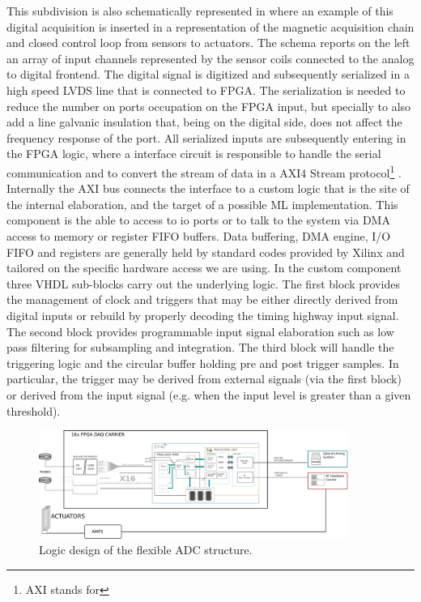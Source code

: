 This subdivision is also schematically represented in \Figure{\ref{fig:daq}} where an example of this digital acquisition is inserted in a representation of the magnetic acquisition chain and closed control loop from sensors to actuators. 
The schema reports on the left an array of input channels represented by the sensor coils connected to the analog to digital frontend. The digital signal is digitized and subsequently serialized in a high speed \ac{LVDS} line that is connected to FPGA. The serialization is needed to reduce the number on ports occupation on the FPGA input, but specially to also add a line galvanic insulation that, being on the digital side, does not affect the frequency response of the port.
All serialized inputs are subsequently entering in the FPGA logic, where a interface circuit is responsible to handle the serial communication and to convert the stream of data in a AXI4 Stream protocol\footnote{AXI stands for } \cite{AXI4}. Internally the AXI bus connects the interface to a custom logic that is the site of the internal elaboration, and the target of a possible ML implementation. This component is the able to access to io ports or to talk to the system via \ac{DMA} access to memory or register FIFO buffers.
%
Data buffering, DMA engine, I/O FIFO and registers are generally held by standard codes provided by Xilinx and tailored on the specific hardware access we are using. In the custom component three VHDL sub-blocks carry out the underlying logic. The first block provides the management of clock and triggers that may be either directly derived from digital inputs or rebuild by properly decoding the timing highway input signal. The second block provides programmable input signal elaboration such as low pass filtering for subsampling and integration. The third block will handle the triggering logic and the circular buffer holding pre and post trigger samples. In particular, the trigger may be derived from external signals (via the first block) or derived from the input signal (e.g. when the input level is greater than a given threshold).    

\begin{figure}[ht]
\centering
\includegraphics[width=0.9\textwidth]{img/4_EmbeddedML/DAQ_chain.eps}
\caption{Logic design of the flexible ADC structure.}
\label{fig:daq}
\end{figure}

